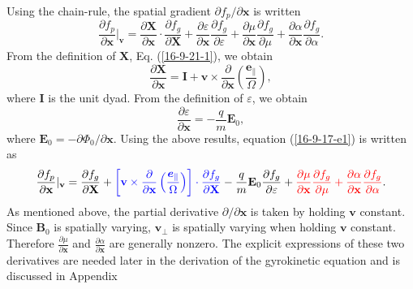 \documentclass{article}
\newcommand{\nobracket}{}
\newcommand{\tmcolor}[2]{{\color{#1}{#2}}}
\newcommand{\tmmathbf}[1]{\ensuremath{\boldsymbol{#1}}}
\begin{document}
Using the chain-rule, the spatial gradient $\partial f_p / \partial
\mathbf{x}$ is written
\begin{equation}
  \label{16-9-17-e1} \frac{\partial f_p}{\partial \mathbf{x}} |_{\mathbf{v}}
  \nobracket = \frac{\partial \mathbf{X}}{\partial \mathbf{x}} \cdot
  \frac{\partial f_g}{\partial \mathbf{X}} + \frac{\partial
  \varepsilon}{\partial \mathbf{x}}  \frac{\partial f_g}{\partial \varepsilon}
  + \frac{\partial \mu}{\partial \mathbf{x}}  \frac{\partial f_g}{\partial
  \mu} + \frac{\partial \alpha}{\partial \mathbf{x}}  \frac{\partial
  f_g}{\partial \alpha} .
\end{equation}
From the definition of $\mathbf{X}$, Eq. (\ref{16-9-21-1}), we obtain
\begin{equation}
  \frac{\partial \mathbf{X}}{\partial \mathbf{x}} =\mathbf{I}+\mathbf{v}
  \times \frac{\partial}{\partial \mathbf{x}} \left(
  \frac{\tmmathbf{e}_{\parallel}}{\Omega} \right),
\end{equation}
where $\mathbf{I}$ is the unit dyad. From the definition of $\varepsilon$, we
obtain
\begin{equation}
  \frac{\partial \varepsilon}{\partial \mathbf{x}} = - \frac{q}{m}
  \mathbf{E}_0,
\end{equation}
where $\mathbf{E}_0 = - \partial \Phi_0 / \partial \mathbf{x}$. Using the
above results, equation (\ref{16-9-17-e1}) is written as
\begin{equation}
  \label{22-9-24-p1} \frac{\partial f_p}{\partial \mathbf{x}} |_{\mathbf{v}}
  \nobracket = \frac{\partial f_g}{\partial \mathbf{X}} +
  \tmcolor{blue}{\left[ \mathbf{v} \times \frac{\partial}{\partial \mathbf{x}}
  \left( \frac{\tmmathbf{e}_{\parallel}}{\Omega} \right) \right] \cdot
  \frac{\partial f_g}{\partial \mathbf{X}}} - \frac{q}{m} \mathbf{E}_0
  \frac{\partial f_g}{\partial \varepsilon} + \tmcolor{red}{\frac{\partial
  \mu}{\partial \mathbf{x}}  \frac{\partial f_g}{\partial \mu} +
  \frac{\partial \alpha}{\partial \mathbf{x}}  \frac{\partial f_g}{\partial
  \alpha}} .
\end{equation}
As mentioned above, the partial derivative $\partial / \partial \mathbf{x}$ is
taken by holding $\mathbf{v}$ constant. Since $\mathbf{B}_0$ is spatially
varying, $\mathbf{v}_{\perp}$ is spatially varying when holding $\mathbf{v}$
constant. Therefore $\frac{\partial \mu}{\partial \mathbf{x}}$ and
$\frac{\partial \alpha}{\partial \mathbf{x}}$ are generally nonzero. The
explicit expressions of these two derivatives are needed later in the
derivation of the gyrokinetic equation and is discussed in Appendix
\end{document}
